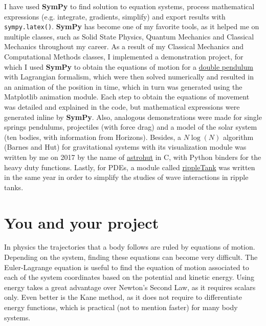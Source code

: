 \documentclass[12pt]{article}
\newcommand{\sympy}{\textbf{SymPy}}
\begin{document}
I have used \sympy{} to find solution to equation systems, process mathematical expressions (e.g. integrate, gradients, simplify) and export results with \texttt{sympy.latex()}. \sympy{} has become one of my favorite tools, as it helped me on multiple classes, such as Solid State Physics, Quantum Mechanics and Classical Mechanics throughout my career. As a result of my Classical Mechanics and Computational Methods classes, I implemented a demonstration project, for which I used \sympy{} to obtain the equations of motion for a \href{https://github.com/ComputoCienciasUniandes/Demonstrations/tree/master/DoublePendulum}{double pendulum} with Lagrangian formalism, which were then solved numerically and resulted in an animation of the position in time, which in turn was generated using the Matplotlib animation module. Each step to obtain the equations of movement was detailed and explained in the code, but mathematical expressions were generated inline by \sympy{}. Also, analogous demonstrations were made for single springs pendulums, projectiles (with force drag) and a model of the solar system (ten bodies, with information from Horizons). Besides, a $N\log(N)$ algorithm (Barnes and Hut) for gravitational systems with its visualization module was written by me on 2017 by the name of \href{https://jsbarbosa.github.io/astrohut/}{astrohut} in C, with Python binders for the heavy duty functions. Lastly, for PDEs, a module called \href{https://jsbarbosa.github.io/rippleTank/}{rippleTank} was written in the same year in order to simplify the studies of wave interactions in ripple tanks.  

\section{You and your project}
In physics the trajectories that a body follows are ruled by equations of motion. Depending on the system, finding these equations can become very difficult. The Euler-Lagrange equation is useful to find the equation of motion associated to each of the system coordinates based on the potential and kinetic energy. Using energy takes a great advantage over Newton's Second Law, as it requires scalars only. Even better is the Kane method, as it does not require to differentiate energy functions, which is practical (not to mention faster) for many body systems.
\end{document}

